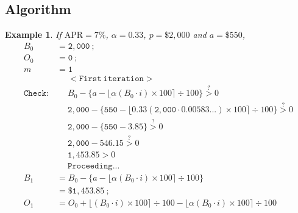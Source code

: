 \documentclass[12pt,letterpaper,oneside]{article}
\newtheorem{example}{Example}[section]
\theoremstyle{remark} %
\begin{document}
	\subsection{Algorithm}
	\newcommand{\rate}{0.00583...}
	\newcommand{\proportion}{0.33}
	\newcommand{\amount}{550}
	\newcommand{\balance}{2,000}
	\newcommand{\interest}{0}
	\newcommand{\months}{0}
	\newcommand{\monthsp}{1}
	\newcommand{\balanceitb}{1,453.85}
	\newcommand{\interestitb}{7.82}
	\newcommand{\monthsitb}{1}
	\newcommand{\monthspitb}{2}
	\newcommand{\balanceitc}{906.65}
	\newcommand{\interestitc}{13.50}
	\newcommand{\monthsitc}{2}
	\newcommand{\monthspitc}{3}
	\newcommand{\balanceitf}{358.40}
	\newcommand{\interestitf}{17.04}
	\newcommand{\monthsitf}{3}%
	\newcommand{\monthspitf}{4}%
	\newcommand{\amountfinal}{377.53}
	\begin{example}
	If $\mbox{APR}=7\%$, $\alpha=0.33$, $p=\$2,000$ and $a=\$550$,
	\footnotesize
	\begin{align*}
	B_{0}&=\mathtt{\balance}\ ;\\
	O_{0}&=\mathtt{\interest}\ ;\\
	m&=\mathtt{\monthsp}\\[12pt]
	&\quad\;\mathtt{<First\ iteration>}\\
	\mathtt{Check:}&\quad\;B_{\months}-\Big\{a-\big\lfloor{\alpha\left(B_{\months}\cdot i\right)\times 100}\big\rceil\div 100\Big\}\overset{?}{>}0\\[-6pt]
	&\quad\;\mathtt{\balance}-\Big\{\mathtt{\amount}-\big\lfloor{\mathtt{\proportion}\left(\mathtt{\balance}\cdot \mathtt{\rate}\right)\times 100}\big\rceil\div 100\Big\}\overset{?}{>}0\\[-6pt]
	&\quad\;\mathtt{\balance}-\Big\{\mathtt{\amount}-\mathtt{3.85}\Big\}\overset{?}{>}0\\[-6pt]
	&\quad\;\mathtt{\balance}-\mathtt{546.15}\overset{?}{>}0\\
	&\quad\;\mathtt{1,453.85}>0\\
	&\quad\;\mathtt{Proceeding...}\\[12pt]
	B_{\monthsp}&=B_{\months}-\Big\{a-\big\lfloor{\alpha\left(B_{\months}\cdot i\right)\times 100}\big\rceil\div 100\Big\}\\
	&=\mathtt{\$1,453.85}\ ;\\[12pt]
	O_{\monthsp}&=O_{\months}+\big\lfloor{\left(B_{\months}\cdot i\right)\times 100}\big\rceil\div 100-\big\lfloor{\alpha\left(B_{\months}\cdot i\right)\times 100}\big\rceil\div 100\\

\end{align*}
\end{example}
\end{document}
